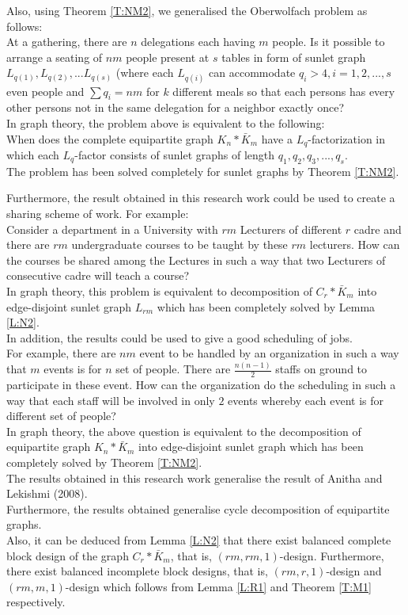 \documentclass[12pt]{report}
\begin{document}
Also, using Theorem \ref{T:NM2}, we generalised  the Oberwolfach problem as follows:\\
At a gathering, there are $n$ delegations each having $m$ people. Is it possible to arrange a seating of $nm$ people present at $s$ tables in form of sunlet graph $L_{q(1)},L_{q(2)},...L_{q(s)}$ (where each $L_{q(i)}$ can accommodate $q_i>4, i=1,2,...,s$ even people and $ \sum q_i=nm$ for $k$ different meals so that each persons has every other persons not in the same delegation for a neighbor exactly once?\\
In graph theory, the problem above is equivalent to the following:\\
When does the complete equipartite graph $K_n*\bar{K}_m$ have a
$L_q$-factorization in which each $L_q$-factor consists of sunlet
graphs of length $q_1,q_2,q_3,...,q_s$.\\
 The problem has been solved completely for sunlet graphs by Theorem
 \ref{T:NM2}.


Furthermore, the result obtained in this research work could be used to create a sharing scheme of work. For example:\\
Consider a department in a University with $rm$ Lecturers of different $r$ cadre and there are $rm$ undergraduate courses to be taught by these $rm$ lecturers. How can the courses be shared among the Lectures in such a way that two Lecturers of consecutive cadre will teach a course?\\
In graph theory, this problem is equivalent to decomposition of $C_r*\bar{K}_m$ into edge-disjoint sunlet graph $L_{rm}$ which has been completely solved by Lemma \ref{L:N2}.\\
In addition, the results could be used to give a good scheduling of jobs.\\
For example, there are $nm$ event to be handled by an organization in such a way that $m$ events is for $n$ set of people. There are $\frac{n(n-1)}{2}$ staffs on ground to participate in these event. How can the organization do the scheduling in such a way that each staff will be involved in only $2$ events whereby each event is for different set of people?\\
In graph theory, the above question is equivalent to the decomposition of equipartite graph $K_n*\bar{K}_m$ into edge-disjoint sunlet graph which has been completely solved by Theorem \ref{T:NM2}.\\


The results obtained in this research work generalise the result of Anitha and Lekishmi (2008).\\ %
Furthermore, the results obtained generalise cycle decomposition of
equipartite graphs.\\
Also, it can be deduced from Lemma \ref{L:N2} that there exist
balanced complete block design of the graph $C_r*\bar{K}_m$, that
is, $(rm,rm,1)$-design. Furthermore, there exist balanced incomplete
block designs, that is, $(rm,r,1)$-design and $(rm,m,1)$-design
which follows from Lemma \ref{L:R1} and Theorem \ref{T:M1}
respectively.\\
\end{document}
